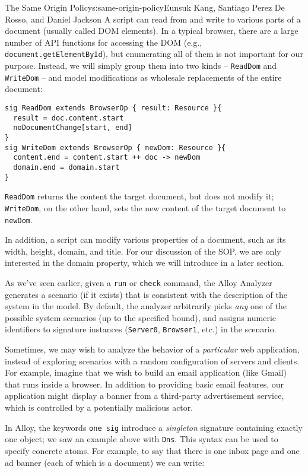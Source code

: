 \begin{aosachapter}{The Same Origin Policy}{s:same-origin-policy}{Eunsuk Kang, Santiago Perez De Rosso, and Daniel Jackson}
A script can read from and write to various parts of a document (usually
called DOM elements). In a typical browser, there are a large number of
API functions for accessing the DOM (e.g.,
\texttt{document.getElementById}), but enumerating all of them is not
important for our purpose. Instead, we will simply group them into two
kinds -- \texttt{ReadDom} and \texttt{WriteDom} -- and model
modifications as wholesale replacements of the entire document:

\begin{verbatim}
sig ReadDom extends BrowserOp { result: Resource }{
  result = doc.content.start
  noDocumentChange[start, end]
}
sig WriteDom extends BrowserOp { newDom: Resource }{
  content.end = content.start ++ doc -> newDom
  domain.end = domain.start
}
\end{verbatim}

\texttt{ReadDom} returns the content the target document, but does not
modify it; \texttt{WriteDom}, on the other hand, sets the new content of
the target document to \texttt{newDom}.

In addition, a script can modify various properties of a document, such
as its width, height, domain, and title. For our discussion of the SOP,
we are only interested in the domain property, which we will introduce
in a later section.

\label{example-applications}

As we've seen earlier, given a \texttt{run} or \texttt{check} command,
the Alloy Analyzer generates a scenario (if it exists) that is
consistent with the description of the system in the model. By default,
the analyzer arbitrarily picks \emph{any} one of the possible system
scenarios (up to the specified bound), and assigns numeric identifiers
to signature instances (\texttt{Server0}, \texttt{Browser1}, etc.) in
the scenario.

Sometimes, we may wish to analyze the behavior of a \emph{particular}
web application, instead of exploring scenarios with a random
configuration of servers and clients. For example, imagine that we wish
to build an email application (like Gmail) that runs inside a browser.
In addition to providing basic email features, our application might
display a banner from a third-party advertisement service, which is
controlled by a potentially malicious actor.

In Alloy, the keywords \texttt{one sig} introduce a \emph{singleton}
signature containing exactly one object; we saw an example above with
\texttt{Dns}. This syntax can be used to specify concrete atoms. For
example, to say that there is one inbox page and one ad banner (each of
which is a document) we can write:


\end{aosachapter}

